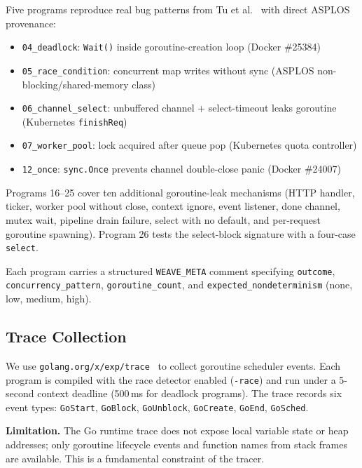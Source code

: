 \documentclass[sigconf,review,anonymous]{acmart}
\begin{document}
Five programs reproduce real bug patterns from Tu et al.~\cite{tu2019understanding}
with direct ASPLOS provenance:
\begin{itemize}
  \item \texttt{04\_deadlock}: \texttt{Wait()} inside goroutine-creation loop
        (Docker \#25384)
  \item \texttt{05\_race\_condition}: concurrent map writes without sync
        (ASPLOS non-blocking/shared-memory class)
  \item \texttt{06\_channel\_select}: unbuffered channel + select-timeout leaks
        goroutine (Kubernetes \texttt{finishReq})
  \item \texttt{07\_worker\_pool}: lock acquired after queue pop (Kubernetes quota
        controller)
  \item \texttt{12\_once}: \texttt{sync.Once} prevents channel double-close panic
        (Docker \#24007)
\end{itemize}

Programs 16--25 cover ten additional goroutine-leak mechanisms (HTTP handler,
ticker, worker pool without close, context ignore, event listener, done channel,
mutex wait, pipeline drain failure, select with no default, and per-request
goroutine spawning). Program 26 tests the select-block signature with a
four-case \texttt{select}.

Each program carries a structured \texttt{WEAVE\_META} comment specifying
\texttt{outcome}, \texttt{concurrency\_pattern}, \texttt{goroutine\_count}, and
\texttt{expected\_nondeterminism} (none, low, medium, high).

\subsection{Trace Collection}

We use \texttt{golang.org/x/exp/trace}~\cite{golang_exp_trace} to collect
goroutine scheduler events. Each program is compiled with the race detector
enabled (\texttt{-race}) and run under a 5-second context deadline (500\,ms for
deadlock programs). The trace records six event types: \texttt{GoStart},
\texttt{GoBlock}, \texttt{GoUnblock}, \texttt{GoCreate}, \texttt{GoEnd},
\texttt{GoSched}.

\textbf{Limitation.} The Go runtime trace does not expose local variable state
or heap addresses; only goroutine lifecycle events and function names from stack
frames are available. This is a fundamental constraint of the tracer.
\end{document}
